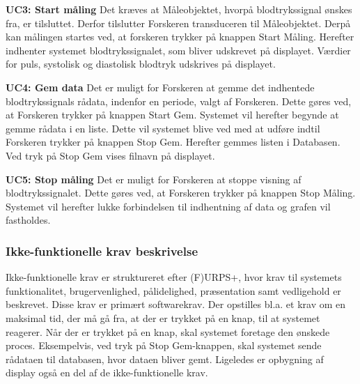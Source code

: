 \textbf{UC3: Start måling}
Det kræves at Måleobjektet, hvorpå blodtrykssignal ønskes fra, er tilsluttet. Derfor tilslutter Forskeren transduceren til Måleobjektet. Derpå kan målingen startes ved, at forskeren trykker på knappen Start Måling. Herefter indhenter systemet blodtrykssignalet, som bliver udskrevet på displayet. Værdier for puls, systolisk og diastolisk blodtryk udskrives på displayet. 

\textbf{UC4: Gem data}
Det er muligt for Forskeren at gemme det indhentede blodtrykssignals rådata, indenfor en periode, valgt af Forskeren. Dette gøres ved, at Forskeren trykker på knappen Start Gem. Systemet vil herefter begynde at gemme rådata i en liste. Dette vil systemet blive ved med at udføre indtil Forskeren trykker på knappen Stop Gem. Herefter gemmes listen i Databasen. Ved tryk på Stop Gem vises filnavn på displayet. 

\textbf{UC5: Stop måling}
Det er muligt for Forskeren at stoppe visning af blodtrykssignalet. Dette gøres ved, at Forskeren trykker på knappen Stop Måling. Systemet vil herefter lukke forbindelsen til indhentning af data og grafen vil fastholdes. 

\subsubsection{Ikke-funktionelle krav beskrivelse}
Ikke-funktionelle krav er struktureret efter (F)URPS+, hvor krav til systemets funktionalitet, brugervenlighed, pålidelighed, præsentation samt vedligehold er beskrevet. Disse krav er primært softwarekrav. Der opstilles bl.a. et krav om en maksimal tid, der må gå fra, at der er trykket på en knap, til at systemet reagerer. Når der er trykket på en knap, skal systemet foretage den ønskede proces. Eksempelvis, ved tryk på Stop Gem-knappen, skal systemet sende rådataen til databasen, hvor dataen bliver gemt. Ligeledes er opbygning af display også en del af de ikke-funktionelle krav.